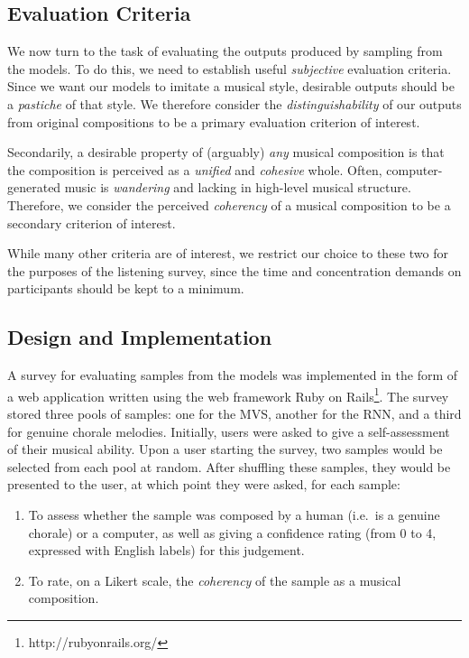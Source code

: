 \documentclass[12pt,a4paper,twoside,openright]{report}
\begin{document}
\subsection{Evaluation Criteria}

We now turn to the task of evaluating the outputs produced by sampling from the
models. To do this, we need to establish useful \emph{subjective} evaluation
criteria. Since we want our models to imitate a musical style, desirable outputs
should be a \emph{pastiche} of that style. We therefore consider the
\emph{distinguishability} of our outputs from original compositions to be a
primary evaluation criterion of interest.

Secondarily, a desirable property of (arguably) \emph{any} musical composition
is that the composition is perceived as a \emph{unified} and \emph{cohesive}
whole. Often, computer-generated music is \emph{wandering} and lacking
in high-level musical structure. Therefore, we consider the perceived
\emph{coherency} of a musical composition to be a secondary criterion of
interest.

While many other criteria are of interest, we restrict our choice to these two
for the purposes of the listening survey, since the time and concentration
demands on participants should be kept to a minimum.

\subsection{Design and Implementation}

A survey for evaluating samples from the models was implemented in the form of a
web application written using the web framework Ruby on
Rails\footnote{http://rubyonrails.org/}.  The survey stored three pools of
samples: one for the MVS, another for the RNN, and a third for genuine chorale
melodies. Initially, users were asked to give a self-assessment of their musical
ability. Upon a user starting the survey, two samples would be selected from
each pool at random.  After shuffling these samples, they would be presented to
the user, at which point they were asked, for each sample:
\begin{enumerate}[label=\arabic*., itemsep=0mm]
  \item To assess whether the sample was composed by a human (i.e.\ is a genuine
    chorale) or a computer, as well as giving a confidence rating (from 0 to 4,
    expressed with English labels) for this judgement.
  \item To rate, on a Likert scale, the \emph{coherency} of the sample as a
    musical composition.
\end{enumerate}
\end{document}
